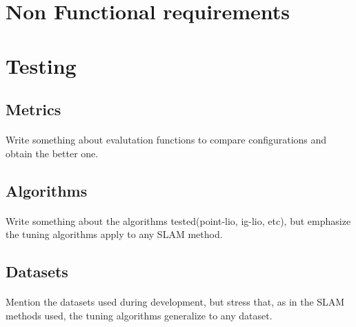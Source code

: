 \section{Non Functional requirements}


\section{Testing}

\subsection{Metrics}

\paragraph{}Write something about evalutation functions to compare configurations and obtain the better one.

\subsection{Algorithms}

\paragraph{}Write something about the algorithms tested(point-lio, ig-lio, etc), but emphasize the tuning algorithms apply to any SLAM method.

\subsection{Datasets}

\paragraph{}Mention the datasets used during development, but stress that, as in the SLAM methods used, the tuning algorithms generalize to any dataset.